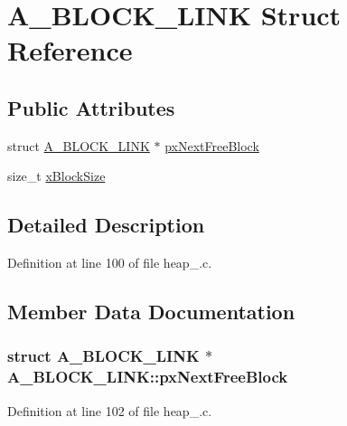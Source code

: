 \hypertarget{struct_a___b_l_o_c_k___l_i_n_k}{}\section{A\+\_\+\+B\+L\+O\+C\+K\+\_\+\+L\+I\+NK Struct Reference}
\label{struct_a___b_l_o_c_k___l_i_n_k}
\subsection*{Public Attributes}
\begin{DoxyCompactItemize}
\item 
struct \hyperlink{struct_a___b_l_o_c_k___l_i_n_k}{A\+\_\+\+B\+L\+O\+C\+K\+\_\+\+L\+I\+NK} $\ast$ \hyperlink{struct_a___b_l_o_c_k___l_i_n_k_aaef1b26e95b0b7b7ebffc91fa6ce874f}{px\+Next\+Free\+Block}
\item 
size\+\_\+t \hyperlink{struct_a___b_l_o_c_k___l_i_n_k_ad5dcf5df03d8be6186c567be9e2c657b}{x\+Block\+Size}
\end{DoxyCompactItemize}


\subsection{Detailed Description}


Definition at line 100 of file heap\+\_.\+c.



\subsection{Member Data Documentation}
\subsubsection[{\texorpdfstring{px\+Next\+Free\+Block}{pxNextFreeBlock}}]{\setlength{\rightskip}{0pt plus 5cm}struct {\bf A\+\_\+\+B\+L\+O\+C\+K\+\_\+\+L\+I\+NK} $\ast$ A\+\_\+\+B\+L\+O\+C\+K\+\_\+\+L\+I\+N\+K\+::px\+Next\+Free\+Block}\hypertarget{struct_a___b_l_o_c_k___l_i_n_k_aaef1b26e95b0b7b7ebffc91fa6ce874f}{}\label{struct_a___b_l_o_c_k___l_i_n_k_aaef1b26e95b0b7b7ebffc91fa6ce874f}


Definition at line 102 of file heap\+\_.\+c.

